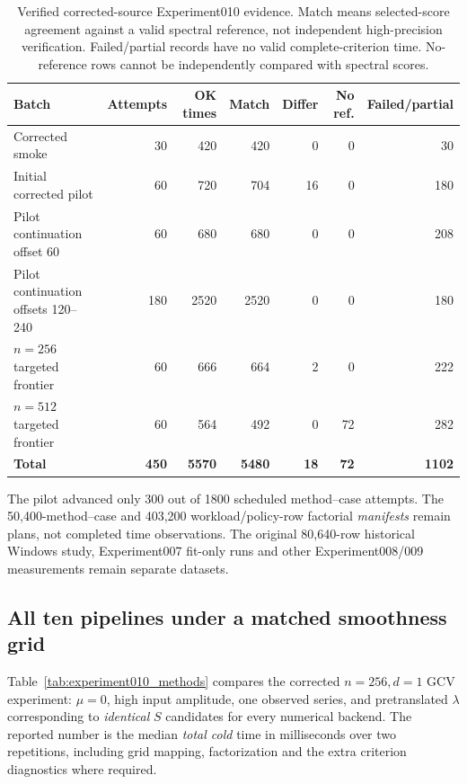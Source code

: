 \begin{table}[t]\centering
\caption{Verified corrected-source Experiment010 evidence. Match
means selected-score agreement against a valid spectral reference,
not independent high-precision verification. Failed/partial records
have no valid complete-criterion time. No-reference rows cannot
be independently compared with spectral scores.}
\label{tab:experiment010_coverage}
\setlength{\tabcolsep}{3pt}
\begin{tabular}{@{}lrrrrrr@{}}
\toprule
Batch & Attempts & OK times & Match & Differ & No ref. & Failed/partial\\
\midrule
Corrected smoke & 30 & 420 & 420 & 0 & 0 & 30\\
Initial corrected pilot & 60 & 720 & 704 & 16 & 0 & 180\\
Pilot continuation offset 60 & 60 & 680 & 680 & 0 & 0 & 208\\
Pilot continuation offsets 120--240 & 180 & 2520 & 2520 & 0 & 0 & 180\\
$n=256$ targeted frontier & 60 & 666 & 664 & 2 & 0 & 222\\
$n=512$ targeted frontier & 60 & 564 & 492 & 0 & 72 & 282\\
\midrule
\textbf{Total} & \textbf{450} & \textbf{5570} & \textbf{5480} &
\textbf{18} & \textbf{72} & \textbf{1102}\\
\bottomrule
\end{tabular}
\end{table}
The pilot advanced only 300 out of 1800 scheduled method--case
attempts. The 50,400-method--case and 403,200 workload/policy-row
factorial \emph{manifests} remain plans, not completed time observations.
The original 80,640-row historical Windows study, Experiment007 fit-only
runs and other Experiment008/009 measurements remain separate datasets.

\subsection{All ten pipelines under a matched smoothness grid}
Table~\ref{tab:experiment010_methods} compares the corrected
$n=256,d=1$ GCV experiment: $\mu=0$, high input amplitude,
one observed series, and pretranslated $\lambda$ corresponding to
\emph{identical} $S$ candidates for every numerical backend.
The reported number is the median \emph{total cold} time in
milliseconds over two repetitions, including grid mapping,
factorization and the extra criterion diagnostics where required.

